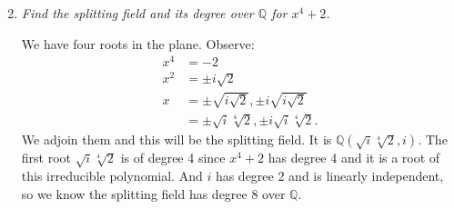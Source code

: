 \documentclass[10pt,oneside,reqno]{amsart}
\theoremstyle{plain}
\theoremstyle{definition}
\theoremstyle{remark}
\theoremstyle{plain}
\newcommand{\Q}{\mathbb{Q}}
\newcommand{\bee}{\begin{equation}\begin{aligned}}
\newcommand{\eee}{\end{aligned}\end{equation}}
\begin{document}
\begin{enumerate}[label=\arabic*.]
\setcounter{enumi}{1}
\item \textit{Find the splitting field and its degree over $\Q$ for $x^4 + 2$. }

We have four roots in the plane. Observe:
\bee
x^4 &= -2\\
x^2 &= \pm i\sqrt{2}\\
x &= \pm \sqrt{i \sqrt{2}}, \pm i\sqrt{i\sqrt{2}}\\
&= \pm \sqrt{i}\sqrt[4]{2},\pm i\sqrt{i}\sqrt[4]{2}.
\eee
We adjoin them and this will be the splitting field. It is $\Q(\sqrt{i}\sqrt[4]{2}, i)$. The first root $\sqrt{i}\sqrt[4]{2}$ is of degree 4 since $x^4 + 2$ has degree 4 and it is a root of this irreducible polynomial. And $i$ has degree 2 and is linearly independent, so we know the splitting field has degree 8 over $\Q$. 

\end{enumerate}
\end{document}
